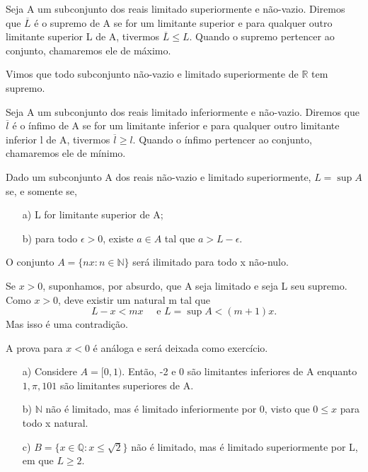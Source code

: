 \documentclass[Analysis/analysis_notes.tex]{subfiles}
\begin{document}
\begin{def*}
	Seja A um subconjunto dos reais limitado superiormente e n\~ao-vazio. Diremos que $\overline{L}$ \'e o supremo de A se for um limitante superior
	e para qualquer outro limitante superior L de A, tivermos $\overline{L}\leq L$. Quando o supremo pertencer ao conjunto, chamaremos ele de m\'aximo.
\end{def*}
Vimos que todo subconjunto n\~ao-vazio e limitado superiormente de $\mathbb{R}$ tem supremo.
\begin{def*}
	Seja A um subconjunto dos reais limitado inferiormente e n\~ao-vazio. Diremos que $\overline{l}$ \'e o \'infimo de A se for um limitante inferior
	e para qualquer outro limitante inferior l de A, tivermos $\overline{l}\geq l$. Quando o \'infimo pertencer ao conjunto, chamaremos ele de m\'inimo.
\end{def*}
\begin{prop*}
	Dado um subconjunto A dos reais n\~ao-vazio e limitado superiormente, $L = \sup{A}$ se, e somente se,
	\begin{itemize}
		\item[a)] L for limitante superior de A;
		\item[b)] para todo $\epsilon > 0$, existe $a\in A$ tal que $a > L - \epsilon.$
	\end{itemize}
\end{prop*}
\begin{theorem*}
	O conjunto $A=\{nx: n\in\mathbb{N}\}$ ser\'a ilimitado para todo x n\~ao-nulo.
\end{theorem*}
\begin{proof*}
	Se $x > 0$, suponhamos, por absurdo, que A seja limitado e seja L seu supremo. Como $x > 0$, deve existir um natural m tal que
	$$
		L - x < mx \quad\text{ e } L = \sup{A} < (m+1)x.
	$$
	Mas isso \'e uma contradi\c c\~ao.

	A prova para $x < 0$ \'e an\'aloga e ser\'a deixada como exerc\'icio. \qedsymbol
\end{proof*}
\begin{example}
	\begin{itemize}
		\item[a)] Considere $A = [0, 1).$ Ent\~ao, -2 e 0 s\~ao limitantes inferiores de A enquanto $1, \pi, 101$ s\~ao limitantes
		      superiores de A.
		\item[b)] $\mathbb{N}$ n\~ao \'e limitado, mas \'e limitado inferiormente por 0, visto que $0\leq{x}$ para todo x natural.
		\item[c)] $B=\{x\in \mathbb{Q}: x\leq{\sqrt{2}}\}$ n\~ao \'e limitado, mas \'e limitado superiormente por L, em que $L\geq{2}.$ \qedsymbol
	\end{itemize}
\end{example}
\end{document}
